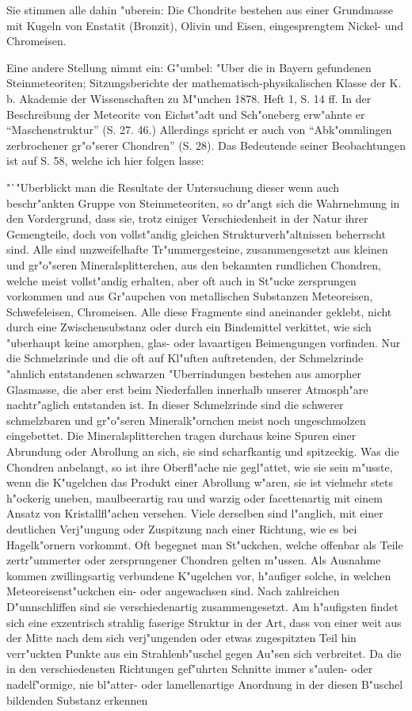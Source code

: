 \documentclass[a4paper, 11pt, oneside]{article}
\begin{document}
Sie stimmen alle dahin "uberein: Die Chondrite bestehen aus einer Grundmasse mit Kugeln von Enstatit (Bronzit), Olivin und Eisen, eingesprengtem Nickel- und Chromeisen.

Eine andere Stellung nimmt ein: G"umbel: "Uber die in Bayern gefundenen Steinmeteoriten; Sitzungsberichte der mathematisch-physikalischen Klasse der K. b. Akademie der Wissenschaften zu M"unchen 1878. Heft 1, S. 14 ff. In der Beschreibung der Meteorite von Eichst"adt und Sch"oneberg erw"ahnte er "`Maschenstruktur"' (S. 27. 46.) Allerdings spricht er auch von "`Abk"ommlingen zerbrochener gr"o"serer Chondren"' (S. 28). Das Bedeutende seiner Beobachtungen ist auf S. 58, welche ich hier folgen lasse:

"`"Uberblickt man die Resultate der Untersuchung dieser wenn auch beschr"ankten Gruppe von Steinmeteoriten, so dr"angt sich die Wahrnehmung in den Vordergrund, dass sie, trotz einiger Verschiedenheit in der Natur ihrer Gemengteile, doch von vollst"andig gleichen Strukturverh"altnissen beherrscht sind. Alle sind unzweifelhafte Tr"ummergesteine, zusammengesetzt aus kleinen und gr"o"seren Mineralsplitterchen, aus den bekannten rundlichen Chondren, welche meist vollst"andig erhalten, aber oft auch in St"ucke zersprungen vorkommen und aus Gr"aupchen von metallischen Substanzen Meteoreisen, Schwefeleisen, Chromeisen. Alle diese Fragmente sind aneinander geklebt, nicht durch eine Zwischensubstanz oder durch ein Bindemittel verkittet, wie sich "uberhaupt keine amorphen, glas- oder lavaartigen Beimengungen vorfinden. Nur die Schmelzrinde und die oft auf Kl"uften auftretenden, der Schmelzrinde "ahnlich entstandenen schwarzen "Uberrindungen bestehen aus amorpher Glasmasse, die aber erst beim Niederfallen innerhalb unserer Atmosph"are nachtr"aglich entstanden ist. In dieser Schmelzrinde sind die schwerer schmelzbaren und gr"o"seren Mineralk"ornchen meist noch ungeschmolzen eingebettet. Die Mineralsplitterchen tragen durchaus keine Spuren einer Abrundung oder Abrollung an sich, sie sind scharfkantig und spitzeckig. Was die Chondren anbelangt, so ist ihre Oberfl"ache nie gegl"attet, wie sie sein m"usste, wenn die K"ugelchen das Produkt einer Abrollung w"aren, sie ist vielmehr stets h"ockerig uneben, maulbeerartig rau und warzig oder facettenartig mit einem Ansatz von Kristallfl"achen versehen. Viele derselben sind l"anglich, mit einer deutlichen Verj"ungung oder Zuspitzung nach einer Richtung, wie es bei Hagelk"ornern vorkommt. Oft begegnet man St"uckchen, welche offenbar als Teile zertr"ummerter oder zersprungener Chondren gelten m"ussen. Als Ausnahme kommen zwillingsartig verbundene K"ugelchen vor, h"aufiger solche, in welchen Meteoreisenst"uckchen ein- oder angewachsen sind. Nach zahlreichen D"unnschliffen sind sie verschiedenartig zusammengesetzt. Am h"aufigsten findet sich eine exzentrisch strahlig faserige Struktur in der Art, dass von einer weit aus der Mitte nach dem sich verj"ungenden oder etwas zugespitzten Teil hin verr"uckten Punkte aus ein Strahlenb"uschel gegen Au"sen sich verbreitet. Da die in den verschiedensten Richtungen gef"uhrten Schnitte immer s"aulen- oder nadelf"ormige, nie bl"atter- oder lamellenartige Anordnung in der diesen B"uschel bildenden Substanz erkennen 
\end{document}
